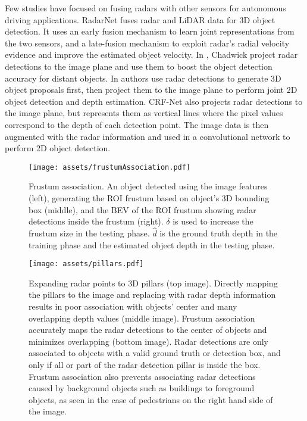 \documentclass[10pt,twocolumn,letterpaper]{article}
\begin{document}
   Few studies have focused on fusing radars with other sensors
   for autonomous driving applications. RadarNet \cite{yangRadarNetExploitingRadar2020}
   fuses radar and 
   LiDAR data for 3D object detection. It uses an early fusion mechanism to learn 
   joint representations from the two sensors, and a late-fusion mechanism to 
   exploit radar's radial velocity evidence and improve the estimated object velocity.
   In \cite{chadwickDistantVehicleDetection2019}, Chadwick \etal project radar detections to the image plane and use them to 
   boost the object detection accuracy for distant objects. In 
   \cite{nabatiRadarCameraSensorFusion2020} authors use radar detections to 
   generate 3D object proposals first, then project them to the image plane 
   to perform joint 2D object detection and depth estimation. CRF-Net 
   \cite{nobisDeepLearningbasedRadar2019} also projects radar detections to the 
   image plane, but represents them as vertical lines where the pixel values 
   correspond to the depth of each detection point. The image data is then augmented 
   with the radar information and used in a convolutional network to perform 2D object 
   detection.
   
   \begin{figure*}[ht!]
      \texttt{[image: assets/frustumAssociation.pdf]}
      \caption{Frustum association. An object detected using the image 
      features (left), generating the ROI frustum based on object's 3D bounding
      box (middle), and the BEV of the ROI frustum showing radar detections 
      inside the frustum (right). $\delta$ is used to increase the frustum size 
      in the testing phase. $\hat{d}$ is the ground truth depth in the training 
      phase and the estimated object depth in the testing phase.}
      \label{fig:frustum}
   \end{figure*}
   
   \begin{figure}[ht!]
      \texttt{[image: assets/pillars.pdf]}
      \caption{Expanding radar points to 3D pillars (top image). 
           Directly mapping the pillars to the image and replacing with 
           radar depth information results in poor association with objects' 
           center and many overlapping depth values (middle image). 
           Frustum association accurately maps the radar detections
           to the center of objects and minimizes overlapping (bottom image).
           Radar detections are only associated to objects with a valid ground 
           truth or detection box, and only if all or part of the radar detection 
           pillar is inside the box. Frustum association also prevents associating 
           radar detections caused by background objects such as buildings to 
           foreground objects, as seen in the case of pedestrians on the right 
           hand side of the image.}
      \label{fig:pillars}
   \end{figure}
   
\end{document}
